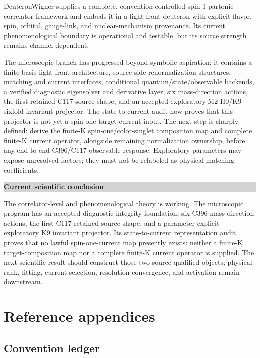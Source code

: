 \documentclass[11pt,oneside]{book}
\newenvironment{claimbox}[1]{%
  \begin{center}\begin{minipage}{0.94\textwidth}
  \colorbox{lightgray}{\parbox{0.96\textwidth}{\textbf{#1}}}\smallskip\par
}{%
  \end{minipage}\end{center}
}
\begin{document}
DeuteronWigner supplies a complete, convention-controlled spin-1 partonic correlator framework and embeds it in a light-front deuteron with explicit flavor, spin, orbital, gauge-link, and nuclear-mechanism provenance.  Its current phenomenological boundary is operational and testable, but its source strength remains channel dependent.

The microscopic branch has progressed beyond symbolic aspiration: it contains a finite-basis light-front architecture, source-side renormalization structures, matching and current interfaces, conditional quantum/state/observable backends, a verified diagnostic eigensolver and derivative layer, six mass-direction actions, the first retained C117 source shape, and an accepted exploratory M2 H0/K9 sixfold invariant projector.  The state-to-current audit now proves that this projector is not yet a spin-one target-current input. The next step is sharply defined: derive the finite-K spin-one/color-singlet composition map and complete finite-K current operator, alongside remaining normalization ownership, before any end-to-end C396/C117 observable response. Exploratory parameters may expose unresolved factors; they must not be relabeled as physical matching coefficients.

\begin{claimbox}{Current scientific conclusion}
The correlator-level and phenomenological theory is working. The microscopic program has an accepted diagnostic-integrity foundation, six C396 mass-direction actions, the first C117 retained source shape, and a parameter-explicit exploratory K9 invariant projector. Its state-to-current representation audit proves that no lawful spin-one-current map presently exists: neither a finite-K target-composition map nor a complete finite-K current operator is supplied. The next scientific result should construct those two source-qualified objects; physical rank, fitting, current selection, resolution convergence, and activation remain downstream.
\end{claimbox}

\appendix
\part{Reference appendices}

\chapter{Convention ledger}
\label{app:conventions}
\end{document}
